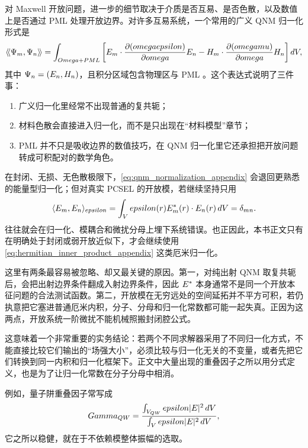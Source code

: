 对 Maxwell 开放问题，进一步的细节取决于介质是否互易、是否色散，以及数值上是否通过 PML 处理开放边界。对许多互易系统，一个常用的广义 QNM 归一化形式是
\begin{equation}
\left\langle\!\left\langle \Psi_m,\Psi_n\right\rangle\!\right\rangle
=
\int_{Omega+PML}
\left[
E_m\cdot\frac{\partial (omegaepsilon)}{\partial omega}E_n
-
H_m\cdot\frac{\partial (omegamu)}{\partial omega}H_n
\right]d V,
\label{eq:qnm_normalization_appendix}
\end{equation}
其中 $\Psi_n=(E_n,H_n)$，且积分区域包含物理区与 PML \cite{sauvan2013qnm,kristensen2015qnm}。这个表达式说明了三件事：
\begin{enumerate}
  \item 广义归一化里经常不出现普通的复共轭；
  \item 材料色散会直接进入归一化，而不是只出现在“材料模型”章节；
  \item PML 并不只是吸收边界的数值技巧，在 QNM 归一化里它还承担把开放问题转成可积配对的数学角色。
\end{enumerate}

在封闭、无损、无色散极限下，\cref{eq:qnm_normalization_appendix} 会退回更熟悉的能量型归一化；但对真实 PCSEL 的开放模，若继续坚持只用
\begin{equation}
\langle E_m,E_n\rangle_{epsilon}
=
\int_V epsilon(r)E_m^*(r)\cdot E_n(r)\,d V
=
\delta_{mn}.
\label{eq:hermitian_inner_product_appendix}
\end{equation}
往往就会在归一化、模耦合和微扰分母上埋下系统错误。也正因此，本书正文只有在明确处于封闭或弱开放近似下，才会继续使用\cref{eq:hermitian_inner_product_appendix} 这类厄米归一化。

这里有两条最容易被忽略、却又最关键的原因。第一，对纯出射 QNM 取复共轭后，会把出射边界条件翻成入射边界条件，因此 $E^\ast$ 本身通常不是同一个开放本征问题的合法测试函数。第二，开放模在无穷远处的空间延拓并不平方可积，若仍执意把它塞进普通厄米内积，分子、分母和归一化常数都可能一起失真。正因为这两点，开放系统一阶微扰不能机械照搬封闭腔公式。

这意味着一个非常重要的实务结论：若两个不同求解器采用了不同归一化方式，不能直接比较它们输出的“场强大小”，必须比较与归一化无关的不变量，或者先把它们转换到同一内积和归一化框架下。正文中大量出现的重叠因子之所以用分式定义，也是为了让归一化常数在分子分母中相消。

例如，量子阱重叠因子常写成
\begin{equation}
Gamma_{QW}
=
\frac{\int_{V_{QW}} epsilon |E|^2\,d V}
{\int_V epsilon |E|^2\,d V},
\label{eq:overlap_ratio_appendix}
\end{equation}
它之所以稳健，就在于不依赖模整体振幅的选取。

